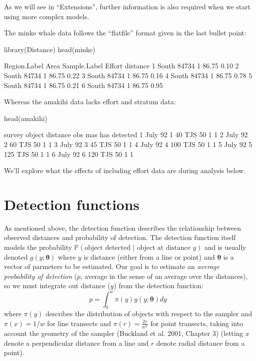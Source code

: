 \documentclass[article]{jss}
\begin{document}
As we will see in ``Extensions'', further information is also required
when we start using more complex models.

The minke whale data follows the ``flatfile'' format given in the last
bullet point:

\begin{CodeChunk}
\begin{CodeInput}
library(Distance)
head(minke)
\end{CodeInput}
\begin{CodeOutput}
  Region.Label  Area Sample.Label Effort distance
1        South 84734            1  86.75     0.10
2        South 84734            1  86.75     0.22
3        South 84734            1  86.75     0.16
4        South 84734            1  86.75     0.78
5        South 84734            1  86.75     0.21
6        South 84734            1  86.75     0.95
\end{CodeOutput}
\end{CodeChunk}

Whereas the amakihi data lacks effort and stratum data:

\begin{CodeChunk}
\begin{CodeInput}
head(amakihi)
\end{CodeInput}
\begin{CodeOutput}
   survey object distance obs mas has detected
1 July 92      1       40 TJS  50   1        1
2 July 92      2       60 TJS  50   1        1
3 July 92      3       45 TJS  50   1        1
4 July 92      4      100 TJS  50   1        1
5 July 92      5      125 TJS  50   1        1
6 July 92      6      120 TJS  50   1        1
\end{CodeOutput}
\end{CodeChunk}

We'll explore what the effects of including effort data are during
analysis below.

\section{Detection functions}\label{detection-functions}

As mentioned above, the detection function describes the relationship
between observed distances and probability of detection. The detection
function itself models the probability
\(\mathbb{P}(\text{object detected } \vert \text{ object at distance } y)\)
and is usually denoted \(g(y; \boldsymbol{\theta})\) where \(y\) is
distance (either from a line or point) and \(\boldsymbol{\theta}\) is a
vector of parmeters to be estimated. Our goal is to estimate an
\emph{average probability of detection} (\(p\), average in the sense of
an average over the distances), so we must integrate out distance
(\(y\)) from the detection function: \[
p = \int_0^w \pi(y) g(y; \boldsymbol{\theta}) dy
\] where \(\pi(y)\) describes the distribution of objects with respect
to the sampler and \(\pi(x)=1/w\) for line transects and
\(\pi(r)=\frac{2r}{w^2}\) for point transects, taking into account the
geometry of the sampler (Buckland et al. 2001, Chapter 3) (letting \(x\)
denote a perpendicular distance from a line and \(r\) denote radial
distance from a point).
\end{document}
